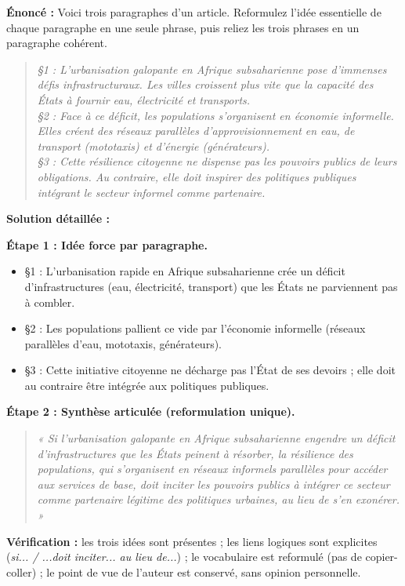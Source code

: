 \documentclass[11pt]{article}
\begin{document}
\begin{exoresolu}
\textbf{Énoncé :} Voici trois paragraphes d'un article. Reformulez l'idée essentielle de chaque paragraphe en une seule phrase, puis reliez les trois phrases en un paragraphe cohérent.
\begin{quote}
\emph{§1 : L'urbanisation galopante en Afrique subsaharienne pose d'immenses défis infrastructuraux. Les villes croissent plus vite que la capacité des États à fournir eau, électricité et transports. \\
§2 : Face à ce déficit, les populations s'organisent en économie informelle. Elles créent des réseaux parallèles d'approvisionnement en eau, de transport (mototaxis) et d'énergie (générateurs). \\
§3 : Cette résilience citoyenne ne dispense pas les pouvoirs publics de leurs obligations. Au contraire, elle doit inspirer des politiques publiques intégrant le secteur informel comme partenaire.}
\end{quote}
\tcblower
\textbf{Solution détaillée :}

\textbf{Étape 1 : Idée force par paragraphe.}
\begin{itemize}
    \item §1 : L'urbanisation rapide en Afrique subsaharienne crée un déficit d'infrastructures (eau, électricité, transport) que les États ne parviennent pas à combler.
    \item §2 : Les populations pallient ce vide par l'économie informelle (réseaux parallèles d'eau, mototaxis, générateurs).
    \item §3 : Cette initiative citoyenne ne décharge pas l'État de ses devoirs ; elle doit au contraire être intégrée aux politiques publiques.
\end{itemize}
\textbf{Étape 2 : Synthèse articulée (reformulation unique).}
\begin{quote}
\emph{« Si l'urbanisation galopante en Afrique subsaharienne engendre un déficit d'infrastructures que les États peinent à résorber, la résilience des populations, qui s'organisent en réseaux informels parallèles pour accéder aux services de base, doit inciter les pouvoirs publics à intégrer ce secteur comme partenaire légitime des politiques urbaines, au lieu de s'en exonérer. »}
\end{quote}
\textbf{Vérification :} les trois idées sont présentes ; les liens logiques sont explicites (\emph{si... / ...doit inciter... au lieu de...}) ; le vocabulaire est reformulé (pas de copier-coller) ; le point de vue de l'auteur est conservé, sans opinion personnelle.
\end{exoresolu}
\end{document}
